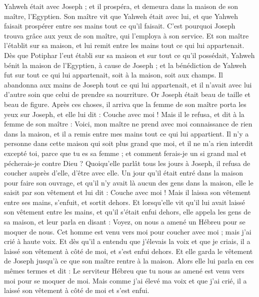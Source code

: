 \begin{multicols}{2}
Yahweh était avec Joseph ; et il prospéra, et demeura dans la maison de son maître,  l’Egyptien.
Son maître vit que Yahweh était avec lui, et que Yahweh faisait prospérer entre ses mains tout ce qu'il faisait.
C'est pourquoi Joseph trouva grâce aux yeux de son maître, qui l’employa à son service. Et son maître l'établit sur sa maison, et lui remit entre les mains tout ce qui lui appartenait.
Dès que Potiphar l’eut établi sur sa maison et sur tout ce qu’il possédait, Yahweh bénit la maison de l’Egyptien, à cause de Joseph ; et la bénédiction de Yahweh fut sur tout ce qui lui appartenait, soit à la maison, soit aux champs.
Il abandonna aux mains de Joseph tout ce qui lui appartenait, et il n’avait avec lui d’autre soin que celui de prendre sa nourriture. Or Joseph était beau de  taille et beau de figure.
Après ces choses, il arriva que la femme de son maître porta les yeux sur Joseph, et elle lui dit : Couche avec moi !
Mais il le refusa, et dit à la femme de son maître : Voici, mon maître ne prend avec moi connaissance de rien dans la maison, et il a remis entre mes mains tout ce qui lui appartient.
Il n'y a personne dans cette maison qui soit plus grand que moi, et il ne m'a rien interdit excepté toi, parce que tu es sa femme ; et comment ferais-je un si grand mal et pécherais-je contre Dieu ?
Quoiqu’elle parlât tous les jours à Joseph, il refusa de coucher auprès d’elle, d’être avec elle.
Un jour qu'il était entré dans la maison pour faire son ouvrage, et qu'il n'y avait là aucun des gens dans la maison,
elle le saisit par son vêtement et lui dit : Couche avec moi ! Mais il laissa son vêtement entre ses mains, s'enfuit, et sortit dehors.
Et lorsqu'elle vit qu'il lui avait laissé son vêtement entre les mains, et qu'il s'était enfui dehors,
elle appela les gens de sa maison, et leur parla en disant : Voyez, on nous a amené un Hébreu pour se moquer de nous.  Cet homme est venu vers moi pour coucher avec moi ; mais j'ai crié à haute voix.
Et dès qu’il a entendu que j’élevais la voix et que je  criais, il a laissé son vêtement à côté de moi, et s’est enfui dehors.
Et elle garda le vêtement de Joseph jusqu'à ce que son maître rentre à la maison.
Alors elle lui parla en ces mêmes termes et dit : Le serviteur Hébreu que tu nous as amené est venu vers moi pour se moquer de moi.
Mais comme j'ai élevé ma voix et que j'ai crié, il a laissé son vêtement à côté de moi et s'est enfui.

\end{multicols}
